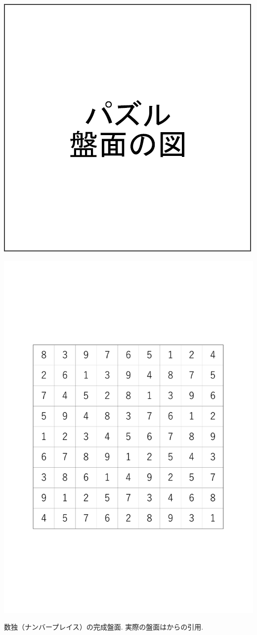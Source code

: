 \begin{clearpagefigure}
  \includegraphics[width=0.85\linewidth,clip]{fig/board.png}
  \caption{}
  \label{figure:Board}
\end{clearpagefigure}

\begin{clearpagefigure}
  \includegraphics[width=0.85\linewidth,clip]{fig/NumberPlace.pdf}
  \caption{数独（ナンバープレイス）の完成盤面. 実際の盤面は\cite{web:Sudoku}からの引用. }
  \label{figure:NumberPlace}
\end{clearpagefigure}

